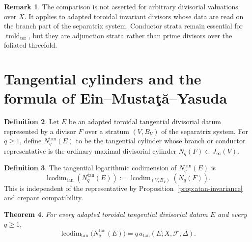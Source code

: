 \documentclass[11pt]{amsart}
\numberwithin{equation}{section}
\theoremstyle{plain}
\newtheorem{Theorem}{Theorem}[section]
\theoremstyle{definition}
\newtheorem{Definition}[Theorem]{Definition}
\newtheorem{Remark}[Theorem]{Remark}
\newcommand{\tmldtor}{\operatorname{tmld}_{\mathrm{tor}}}
\newcommand{\lcodim}{\operatorname{lcodim}}
\newcommand{\cF}{\mathcal F}
\begin{document}
\begin{Remark}
The comparison is not asserted for arbitrary divisorial valuations over $X$.
It applies to adapted toroidal invariant divisors whose data are read on the
branch part of the separatrix system.  Conductor strata remain essential for
$\tmldtor$, but they are adjunction strata rather than prime divisors over
the foliated threefold.
\end{Remark}

\section{Tangential cylinders and the formula of Ein--Musta\c{t}\u{a}--Yasuda}
\label{sec:emy}

\begin{Definition}
Let $E$ be an adapted toroidal tangential divisorial datum represented by a divisor $F$ over a stratum $(V,B_V)$ of the separatrix system.  For $q\ge 1$, define $N_q^{\tan}(E)$ to be the tangential cylinder whose branch or conductor representative is the ordinary maximal divisorial cylinder $N_q(F)\subset J_\infty(V)$.
\end{Definition}

\begin{Definition}
The tangential logarithmic codimension of $N_q^{\tan}(E)$ is
\[
\lcodim_{\tan}(N_q^{\tan}(E)):=\lcodim_{(V,B_V)}(N_q(F)).
\]
This is independent of the representative by Proposition~\ref{prop:atan-invariance} and crepant compatibility.
\end{Definition}

\begin{Theorem}
\label{thm:tangential-emy}
For every adapted toroidal tangential divisorial datum $E$ and every $q\ge 1$,
\[
\lcodim_{\tan}\bigl(N_q^{\tan}(E)\bigr)=q\,a_{\tan}(E;X,\cF,\Delta).
\]
\end{Theorem}
\end{document}
